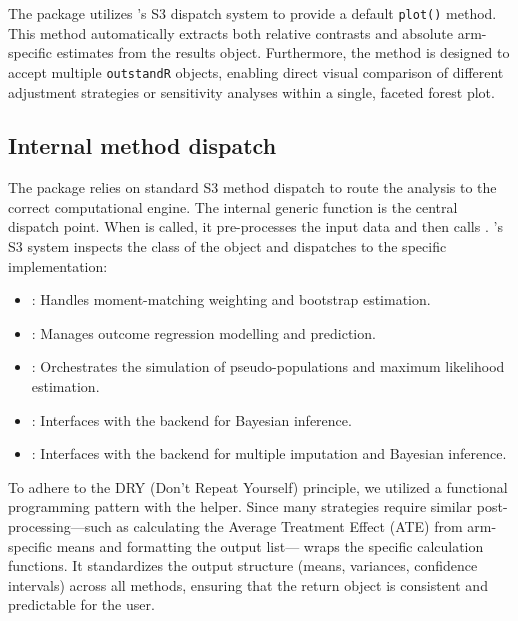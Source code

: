 \documentclass[article]{jss}
\begin{document}
The  package utilizes 's S3 dispatch system to provide a default \texttt{plot()} method. This method automatically extracts both relative contrasts and absolute arm-specific estimates from the results object. Furthermore, the method is designed to accept multiple \texttt{outstandR} objects, enabling direct visual comparison of different adjustment strategies or sensitivity analyses within a single, faceted forest plot.

\subsection{Internal method dispatch}
The  package relies on standard S3 method dispatch to route the analysis to the correct computational engine. The internal generic function  is the central dispatch point.
When  is called, it pre-processes the input data and then calls . 's S3 system inspects the class of the  object and dispatches to the specific implementation:

\begin{itemize}
  \item {}: Handles moment-matching weighting and bootstrap estimation.
  \item {}: Manages outcome regression modelling and prediction.
  \item {}: Orchestrates the simulation of pseudo-populations and maximum likelihood estimation.
  \item {}: Interfaces with the  backend for Bayesian inference.
  \item {}: Interfaces with the  backend for multiple imputation and Bayesian inference.
\end{itemize}

To adhere to the DRY (Don't Repeat Yourself) principle, we utilized a functional programming pattern with the  helper. Since many strategies require similar post-processing---such as calculating the Average Treatment Effect (ATE) from arm-specific means and formatting the output list--- wraps the specific calculation functions. It standardizes the output structure (means, variances, confidence intervals) across all methods, ensuring that the  return object is consistent and predictable for the user.
\end{document}

